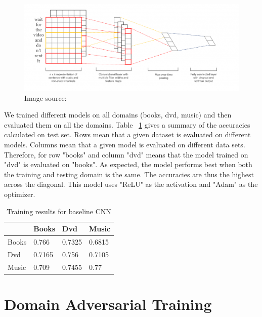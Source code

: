 \documentclass[11pt,a4paper]{article}
\begin{document}
\begin{figure}[htb]
\begin{center}
\includegraphics[width=\columnwidth]{cnn.png}
\end{center}
\caption{Image source: ~\cite{Britz}}
\label{fig:figure1}
\end{figure}

We trained different models on all domains (books, dvd, music) and then evaluated them on all the domains. Table ~\ref{cnn-table} gives a summary of the accuracies calculated on test set. Rows mean that a given dataset is evaluated on different models. Columns mean that a given model is evaluated on different data sets. Therefore, for row "books" and column "dvd" means that the model trained on "dvd" is evaluated on "books". As expected, the model performs best when both the training and testing domain is the same. The accuracies are thus the highest across the diagonal. This model uses "ReLU" as the activation and "Adam" as the optimizer.


\begin{table}[h]
\begin{center}
\begin{tabular}{|l|l|l|l|}
\hline \bf & \bf Books & \bf Dvd & \bf Music \\ \hline
Books & 0.766 & 0.7325 & 0.6815 \\
Dvd & 0.7165 & 0.756 & 0.7105 \\
Music & 0.709 & 0.7455 & 0.77 \\
\hline
\end{tabular}
\end{center}
\caption{ Training results for baseline CNN }
\label{cnn-table}
\end{table}



\section{Domain Adversarial Training}
\end{document}
